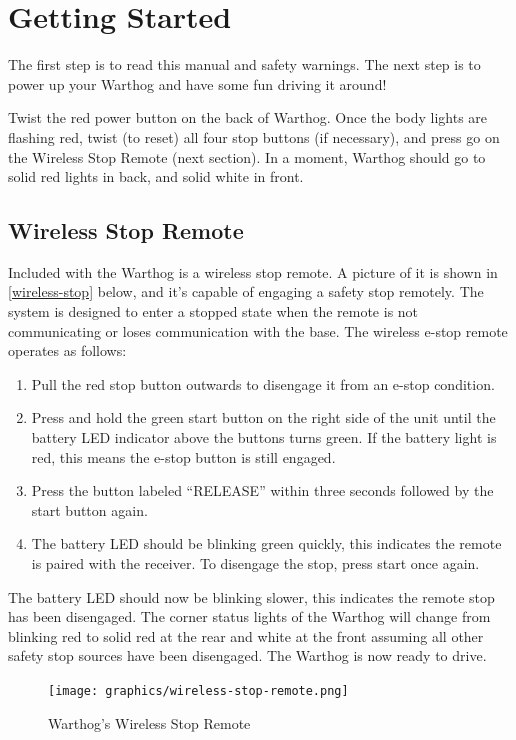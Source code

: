 \documentclass[]{clearpath-latex/clearpath-manual}
\begin{document}
\section{Getting Started}

The first step is to read this manual and safety warnings.  The next step is to power up your Warthog and have some fun driving it around!

Twist the red power button on the back of Warthog. Once the body lights are flashing red, twist (to reset) all four stop buttons (if necessary), and press go on the Wireless Stop Remote (next section). In a moment, Warthog should go to solid red lights in back, and solid white in front.

\subsection{Wireless Stop Remote}

Included with the Warthog is a wireless stop remote. A picture of it is shown in
\autoref{wireless-stop} below, and it's capable of engaging a safety stop remotely.  The system is designed to enter a stopped state when the remote is not communicating or loses communication with the base. The wireless e-stop remote operates as follows:

\begin{enumerate}
  \item Pull the red stop button outwards to disengage it from an e-stop condition.
  \item Press and hold the green start button on the right side of the unit until the battery LED indicator above the buttons turns green. If the battery light is red, this means the e-stop button is still engaged.
  \item Press the button labeled “RELEASE” within three seconds followed by the start button again.
  \item The battery LED should be blinking green quickly, this indicates the remote is paired with the receiver. To disengage the stop, press start once again.
\end{enumerate}

The battery LED should now be blinking slower, this indicates the remote stop has been disengaged. The corner status lights of the Warthog will change from blinking red to solid red at the rear and white at the front assuming all other safety stop sources have been disengaged. The Warthog is now ready to drive.

\begin{figure}[!h]
  \centering
  \texttt{[image: graphics/wireless-stop-remote.png]}
  \caption{Warthog's Wireless Stop Remote}
  \label{wireless-stop}
\end{figure}
\end{document}

